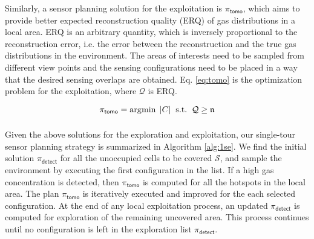 Similarly, a sensor planning solution for the exploitation is $\pi_{\mathsf{tomo}}$, which aims to provide better expected reconstruction quality (ERQ) of gas distributions in a local area. ERQ is an arbitrary quantity, which is inversely proportional to the reconstruction error, i.e. the error between the reconstruction and the true gas distributions in the environment. The areas of interests need to be sampled from different view points and the sensing configurations need to be placed in a way that the desired sensing overlaps are obtained. Eq. \ref{eq:tomo} is the optimization problem for the exploitation, where $\mathcal{Q}$ is ERQ.


\begin{equation}
\pi_\mathsf{tomo} = \displaystyle\operatorname*{\arg\!\min}_{} \; |C| \;\; \mbox{s.t.} \;\; \mathcal{Q} \ge \mathfrak{n}
\label{eq:tomo}
\end{equation}






Given the above solutions for the exploration and exploitation, our single-tour sensor planning strategy is summarized in Algorithm \ref{alg:1se}. We find the initial solution $\pi_{\mathsf{detect}}$ for all the unoccupied cells to be covered $\mathcal{S}$, and sample the environment by executing the first configuration in the list. If a high gas concentration is detected, then $\pi_{\mathsf{tomo}}$ is computed for all the hotspots in the local area. The plan $\pi_{\mathsf{tomo}}$ is iteratively executed and improved for the each selected configuration. At the end of any local exploitation process, an updated $\pi_{\mathsf{detect}}$ is computed for exploration of the remaining uncovered area. This process continues until no configuration is left in the exploration list $\pi_{\mathsf{detect}}$.

 
